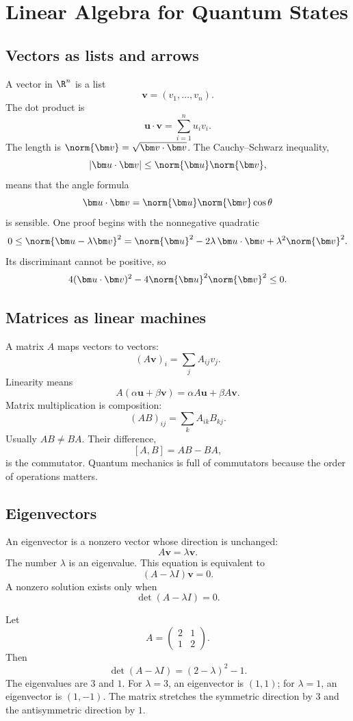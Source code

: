 \chapter{Linear Algebra for Quantum States}

\section{Vectors as lists and arrows}

A vector in \(\R^n\) is a list
\[
  \bm v=(v_1,\ldots,v_n).
\]
The dot product is
\[
  \bm u\cdot\bm v=\sum_{i=1}^n u_iv_i.
\]
The length is \(\norm{\bm v}=\sqrt{\bm v\cdot\bm v}\).  The Cauchy--Schwarz inequality,
\[
  |\bm u\cdot\bm v|\le \norm{\bm u}\norm{\bm v},
\]
means that the angle formula
\[
  \bm u\cdot\bm v=\norm{\bm u}\norm{\bm v}\cos\theta
\]
is sensible.  One proof begins with the nonnegative quadratic
\[
  0\le \norm{\bm u-\lambda \bm v}^2
  =
  \norm{\bm u}^2-2\lambda\,\bm u\cdot\bm v+\lambda^2\norm{\bm v}^2.
\]
Its discriminant cannot be positive, so
\[
  4(\bm u\cdot\bm v)^2-4\norm{\bm u}^2\norm{\bm v}^2\le0.
\]

\section{Matrices as linear machines}

A matrix \(A\) maps vectors to vectors:
\[
  (A\bm v)_i=\sum_j A_{ij}v_j.
\]
Linearity means
\[
  A(\alpha\bm u+\beta\bm v)=\alpha A\bm u+\beta A\bm v.
\]
Matrix multiplication is composition:
\[
  (AB)_{ij}=\sum_k A_{ik}B_{kj}.
\]
Usually \(AB\ne BA\).  Their difference,
\[
  [A,B]=AB-BA,
\]
is the commutator.  Quantum mechanics is full of commutators because the order of operations matters.

\section{Eigenvectors}

An eigenvector is a nonzero vector whose direction is unchanged:
\[
  A\bm v=\lambda\bm v.
\]
The number \(\lambda\) is an eigenvalue.  This equation is equivalent to
\[
  (A-\lambda I)\bm v=0.
\]
A nonzero solution exists only when
\[
  \det(A-\lambda I)=0.
\]

\begin{example}
Let
\[
  A=\begin{pmatrix}2&1\\1&2\end{pmatrix}.
\]
Then
\[
  \det(A-\lambda I)=(2-\lambda)^2-1.
\]
The eigenvalues are \(3\) and \(1\).  For \(\lambda=3\), an eigenvector is \((1,1)\); for \(\lambda=1\), an eigenvector is \((1,-1)\).  The matrix stretches the symmetric direction by \(3\) and the antisymmetric direction by \(1\).
\end{example}

